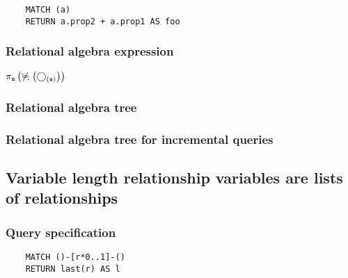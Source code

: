 	\begin{lstlisting}
	MATCH (a)
	RETURN a.prop2 + a.prop1 AS foo
	\end{lstlisting}


	\subsubsection*{Relational algebra expression}

	$\projection{\var{a}} \left(\alldifferent{} \left(\getvertices{a}{}\right)\right)$

	\subsubsection*{Relational algebra tree}


	\subsubsection*{Relational algebra tree for incremental queries}

	\subsection{Variable length relationship variables are lists of relationships}

	\subsubsection*{Query specification}

	\begin{lstlisting}
	MATCH ()-[r*0..1]-()
	RETURN last(r) AS l
	\end{lstlisting}


